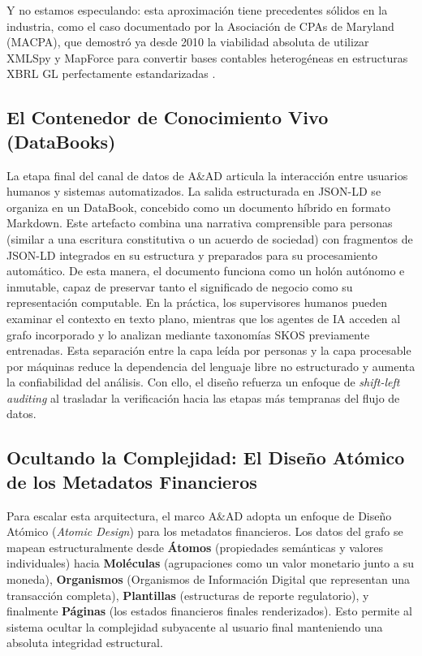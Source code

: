 \documentclass[12pt, a4paper]{article}
\begin{document}
Y no estamos especulando: esta aproximación tiene precedentes sólidos en la industria, como el caso documentado por la Asociación de CPAs de Maryland (MACPA), que demostró ya desde 2010 la viabilidad absoluta de utilizar XMLSpy y MapForce para convertir bases contables heterogéneas en estructuras XBRL GL perfectamente estandarizadas \cite{altova2010}.

\subsection{El Contenedor de Conocimiento Vivo (DataBooks)}
La etapa final del canal de datos de A\&AD articula la interacción entre usuarios humanos y sistemas automatizados. La salida estructurada en JSON-LD se organiza en un DataBook, concebido como un documento híbrido en formato Markdown. Este artefacto combina una narrativa comprensible para personas (similar a una escritura constitutiva o un acuerdo de sociedad) con fragmentos de JSON-LD integrados en su estructura y preparados para su procesamiento automático. De esta manera, el documento funciona como un holón autónomo e inmutable, capaz de preservar tanto el significado de negocio como su representación computable. En la práctica, los supervisores humanos pueden examinar el contexto en texto plano, mientras que los agentes de IA acceden al grafo incorporado y lo analizan mediante taxonomías SKOS previamente entrenadas. Esta separación entre la capa leída por personas y la capa procesable por máquinas reduce la dependencia del lenguaje libre no estructurado y aumenta la confiabilidad del análisis. Con ello, el diseño refuerza un enfoque de \textit{shift-left auditing} al trasladar la verificación hacia las etapas más tempranas del flujo de datos.

\subsection{Ocultando la Complejidad: El Diseño Atómico de los Metadatos Financieros}
Para escalar esta arquitectura, el marco A\&AD adopta un enfoque de Diseño Atómico (\textit{Atomic Design}) para los metadatos financieros. Los datos del grafo se mapean estructuralmente desde \textbf{Átomos} (propiedades semánticas y valores individuales) hacia \textbf{Moléculas} (agrupaciones como un valor monetario junto a su moneda), \textbf{Organismos} (Organismos de Información Digital que representan una transacción completa), \textbf{Plantillas} (estructuras de reporte regulatorio), y finalmente \textbf{Páginas} (los estados financieros finales renderizados). Esto permite al sistema ocultar la complejidad subyacente al usuario final manteniendo una absoluta integridad estructural.
\end{document}
